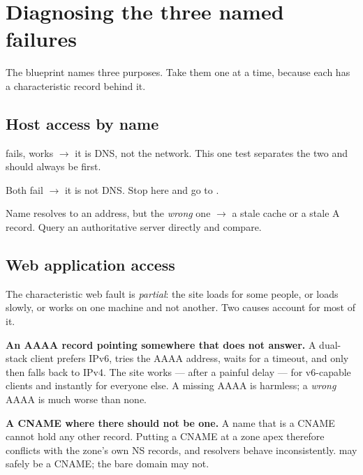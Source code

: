 \section{Diagnosing the three named failures}

The blueprint names three purposes. Take them one at a time, because each has a
characteristic record behind it.

\subsection{Host access by name}

\begin{tight}
  \item {} fails,  works $\rightarrow$ it is
        DNS, not the network. This one test separates the two and should always
        be first.
  \item Both fail $\rightarrow$ it is not DNS. Stop here and go to
        .
  \item Name resolves to an address, but the \emph{wrong} one $\rightarrow$ a
        stale cache or a stale A record. Query an authoritative server directly
        and compare.
\end{tight}

\subsection{Web application access}

The characteristic web fault is \emph{partial}: the site loads for some people,
or loads slowly, or works on one machine and not another. Two causes account for
most of it.

\begin{tight}
  \item \textbf{An AAAA record pointing somewhere that does not answer.} A
        dual-stack client prefers IPv6, tries the AAAA address, waits for a
        timeout, and only then falls back to IPv4. The site works --- after a
        painful delay --- for v6-capable clients and instantly for everyone else.
        A missing AAAA is harmless; a \emph{wrong} AAAA is much worse than none.
  \item \textbf{A CNAME where there should not be one.} A name that is a CNAME
        cannot hold any other record. Putting a CNAME at a zone apex therefore
        conflicts with the zone's own NS records, and resolvers behave
        inconsistently.  may safely be a CNAME; the bare domain may not.
\end{tight}

